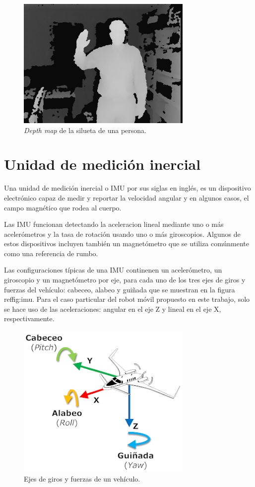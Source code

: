 \begin{figure}[ht]
    \centering
    \includegraphics[scale=2.0]{./Figures/depth_map.png}
    \caption{\textit{Depth map} de la silueta de una persona.}
    \label{fig:depthMap}
\end{figure}

\section{Unidad de medición inercial}

Una unidad de medición inercial o IMU por sus siglas en inglés, es un dispositivo electrónico capaz de medir y reportar la velocidad angular y en algunos casos, el campo magnético que rodea al cuerpo.

Las IMU funcionan detectando la aceleracion lineal mediante uno o más acelerómetros y la tasa de rotación usando uno o más giroscopios. Algunos de estos dispositivos incluyen también un magnetómetro que se utiliza comúnmente como una referencia de rumbo.

Las configuraciones típicas de una IMU continenen un acelerómetro, un giroscopio y un magnetómetro por eje, para cada uno de los tres ejes de giros y fuerzas del vehículo: cabeceo, alabeo y guiñada que se muestran en la figura ref{fig:imu}. Para el caso particular del robot móvil propuesto en este trabajo, solo se hace uso de las aceleraciones: angular en el eje Z y lineal en el eje X, respectivamente.

\begin{figure}[ht]
    \centering
    \includegraphics[scale=1.8]{./Figures/imu.png}
    \caption{Ejes de giros y fuerzas de un vehículo.\protect\footnotemark}
    \label{fig:depthMap}
\end{figure}

